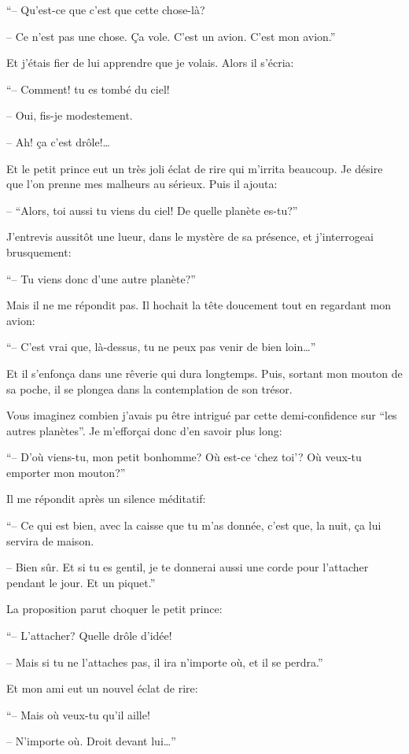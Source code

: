 \begin{Parallel}[p]{}{}
{``-- Qu'est-ce que c'est que cette chose-là?

-- Ce n'est pas une chose. Ça vole. C'est un avion. C'est mon avion.''
 
Et j’étais fier de lui apprendre que je volais. Alors il
s'écria:

``-- Comment! tu es tombé du ciel!

-- Oui, fis-je modestement.

-- Ah! ça c'est drôle!\ldots{}

Et le petit prince eut un très joli éclat de rire qui
m'irrita beaucoup. Je désire que l'on prenne mes
malheurs au sérieux. Puis il ajouta:

-- ``Alors, toi aussi tu viens du ciel! De quelle planète es-tu?''

J'entrevis aussitôt une lueur, dans le mystère de sa
présence, et j'interrogeai brusquement:

``-- Tu viens donc d'une autre planète?''

Mais il ne me répondit pas. Il hochait la tête doucement tout en regardant mon avion:

``-- C'est vrai que, là-dessus, tu ne peux pas venir de
bien loin\ldots{}''

Et il s'enfonça dans une rêverie qui dura longtemps. Puis, sortant mon mouton de sa poche, il se
plongea dans la contemplation de son trésor.

Vous imaginez combien j'avais pu être intrigué
par cette demi-confidence sur ``les autres planètes''.
Je m'efforçai donc d'en savoir plus long:

``-- D'où viens-tu, mon petit bonhomme? Où est-ce
`chez toi'? Où veux-tu emporter mon mouton?''

Il me répondit après un silence méditatif:

``-- Ce qui est bien, avec la caisse que tu m'as donnée, c'est que, la nuit, ça lui servira de maison.

-- Bien sûr. Et si tu es gentil, je te donnerai aussi
une corde pour l'attacher pendant le jour. Et un
piquet.''

La proposition parut choquer le petit prince:

``-- L'attacher? Quelle drôle d'idée!

-- Mais si tu ne l'attaches pas, il ira n'importe où,
et il se perdra.''

Et mon ami eut un nouvel éclat de rire:

``-- Mais où veux-tu qu'il aille!

-- N'importe où. Droit devant lui\ldots{}''

}
\end{Parallel}
